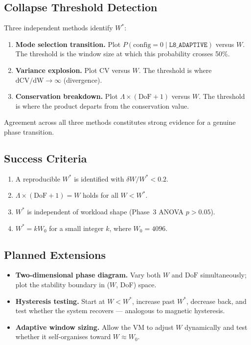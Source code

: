 \subsection{Collapse Threshold Detection}

Three independent methods identify $W^*$:

\begin{enumerate}
  \item \textbf{Mode selection transition.} Plot $P(\text{config}=0 \mid
        \texttt{L8\_ADAPTIVE})$ versus $W$. The threshold is the window size
        at which this probability crosses 50\%.
  \item \textbf{Variance explosion.} Plot CV versus $W$. The threshold is
        where $\mathrm{d CV}/\mathrm{d W} \to \infty$ (divergence).
  \item \textbf{Conservation breakdown.} Plot $\Lambda \times (\mathrm{DoF}+1)$
        versus $W$. The threshold is where the product departs from the
        conservation value.
\end{enumerate}

Agreement across all three methods constitutes strong evidence for a
genuine phase transition.

\subsection{Success Criteria}

\begin{enumerate}
  \item A reproducible $W^*$ is identified with $\delta W / W^* < 0.2$.
  \item $\Lambda \times (\mathrm{DoF}+1) = W$ holds for all $W < W^*$.
  \item $W^*$ is independent of workload shape (Phase~3 ANOVA $p > 0.05$).
  \item $W^* = k W_0$ for a small integer $k$, where $W_0 = 4096$.
\end{enumerate}

\subsection{Planned Extensions}

\begin{itemize}
  \item \textbf{Two-dimensional phase diagram.} Vary both $W$ and $\mathrm{DoF}$
        simultaneously; plot the stability boundary in ($W$, DoF) space.
  \item \textbf{Hysteresis testing.} Start at $W < W^*$, increase past $W^*$,
        decrease back, and test whether the system recovers --- analogous to
        magnetic hysteresis.
  \item \textbf{Adaptive window sizing.} Allow the VM to adjust $W$ dynamically
        and test whether it self-organises toward $W \approx W_0$.
\end{itemize}


